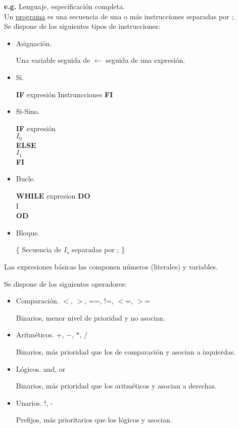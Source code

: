 \documentclass[\main/ApuntesPL.tex]{subfiles}
\begin{document}
      \bigskip
      \par
      \textbf{e.g.} Lenguaje, especificación completa.\\
      \vspace{2mm}
      Un \underline{programa} es una secuencia de una o más instrucciones separadas por ;.\\
      Se dispone de los siguientes tipos de instrucciones:
      \begin{itemize}
        \item Asignación.
          \par
          Una variable seguida de $\leftarrow$ seguida de una expresión.
        \item Si.
          \par
          \textbf{IF} expresión Instruncciones \textbf{FI}
        \item Si-Sino.
          \par
          \textbf{IF} expresión\\
          \hspace{5mm}$I_0$\\
          \textbf{ELSE}\\
          \hspace{5mm}$I_1$\\
          \textbf{FI}
        \item Bucle.
          \par
          \textbf{WHILE} expresion \textbf{DO}\\
          \hspace{5mm}I\\
          \textbf{OD}
        \item Bloque.
          \par
          \{ Secuencia de $I_s$ separadas por ; \}
      \end{itemize}

      \par
      Las expresiones básicas las componen números (literales) y variables.

      \par
      Se dispone de los siguientes operadores:
      \begin{itemize}
        \item Comparación. $<$, $>$, ==, !=, $<$=, $>$=
          \par
          Binarios, menor nivel de prioridad y no asocian.
        \item Aritméticos. +, $-$, $\ast$, /
          \par
          Binarios, más prioridad que los de comparación y asocian a izquierdas.
        \item Lógicos. and, or
          \par
          Binarios, más prioridad que los aritméticos y asocian a derechas.
        \item Unarios. !, -
          \par
          Prefijos, más prioritarios que los lógicos y asocian.
      \end{itemize}
\end{document}
